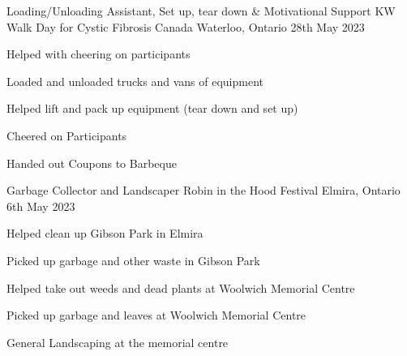 

\begin{cventries}

  \cventry
    {Loading/Unloading Assistant, Set up, tear down \& Motivational Support} %
    {KW Walk Day for Cystic Fibrosis Canada} %
    {Waterloo, Ontario} %
    {28th May 2023} %
    {
      \begin{cvitems} %
        \item {Helped with cheering on participants}
        \item {Loaded and unloaded trucks and vans of equipment}
        \item {Helped lift and pack up equipment (tear down and set up)}
        \item {Cheered on Participants}
        \item {Handed out Coupons to Barbeque}
      \end{cvitems}
    }

  \cventry
    {Garbage Collector and Landscaper} %
    {Robin in the Hood Festival} %
    {Elmira, Ontario} %
    {6th May 2023} %
    {
      \begin{cvitems} %
        \item {Helped clean up Gibson Park in Elmira}
        \item {Picked up garbage and other waste in Gibson Park}
        \item {Helped take out weeds and dead plants at Woolwich Memorial Centre}
        \item {Picked up garbage and leaves at Woolwich Memorial Centre}
        \item {General Landscaping at the memorial centre}
      \end{cvitems}
    }

\end{cventries}
